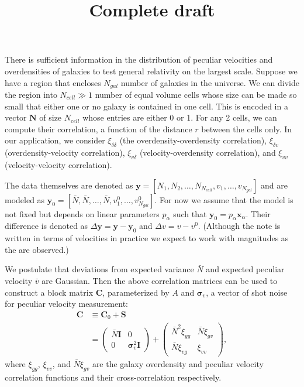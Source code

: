 \documentclass{article}
\title{Complete draft}
\begin{document}
\maketitle


There is sufficient information in the distribution of peculiar velocities and overdensities of galaxies to test general relativity on the largest scale. Suppose we have a region that encloses $N_{gal}$ number of galaxies in the universe. We can divide the region into $N_{cell}\gg 1$ number of equal volume cells whose size can be made so small that either one or no galaxy is contained in one cell. This is encoded in a vector $\textbf{N}$ of size $N_{cell}$ whose entries are either 0 or 1. For any 2 cells, we can compute their correlation, a function of the distance $r$ between the cells only. In our application, we consider $\xi_{\delta\delta}$ (the overdensity-overdensity correlation), $\xi_{\delta v}$ (overdensity-velocity correlation), $\xi_{v\delta}$ (velocity-overdensity correlation), and $\xi_{vv}$ (velocity-velocity correlation).\par

The data themselves are denoted as $\textbf{y} = [N_1, N_2, \hdots, N_{N_{cell}}, v_1, \hdots, v_{N_{gal}}]$
and are modeled as $\textbf{y}_0 =[\bar{N}, \bar{N}, \hdots, \bar{N}, v^0_{1}, \hdots, v^0_{N_{gal}}]$.  For now we assume that the model is not fixed but depends
on linear parameters $p_\alpha$ such that
 $\textbf{y}_0 = p_\alpha \textbf{x}_\alpha$.
Their difference is  denoted as $\Delta \textbf{y}= \textbf{y} - \textbf{y}_0 $ and $\Delta v= v-v^0$.  (Although the note is written in terms of velocities
in practice we expect to work with magnitudes as the are observed.)

We postulate that deviations from expected variance $\bar{N}$ and expected peculiar velocity $\bar{v}$ are Gaussian. Then the above correlation matrices can be used to construct a block matrix $\textbf{C}$, parameterized by $A$ and $\bm{\sigma}_v$, a vector of shot noise for peculiar velocity measurement:
\begin{align}
\textbf{C} &\equiv \textbf{C}_0 + \textbf{S}\\
&=
\left(
\begin{array}{cc}
\bar{N}\textbf{I} & 0 \nonumber \\
0 & \bm{\sigma}_v^2\textbf{I}
\end{array}
\right)
+
\begin{pmatrix}
\bar{N}^2\xi_{gg} & \bar{N}\xi_{g v} \\
\bar{N}\xi_{v g} & \xi_{vv}
\end{pmatrix},
\end{align}
where $\xi_{gg}$, $\xi_{vv}$, and $\bar{N}\xi_{g v}$ are the galaxy overdensity and peculiar velocity correlation functions and their cross-correlation
respectively.  
\end{document}
